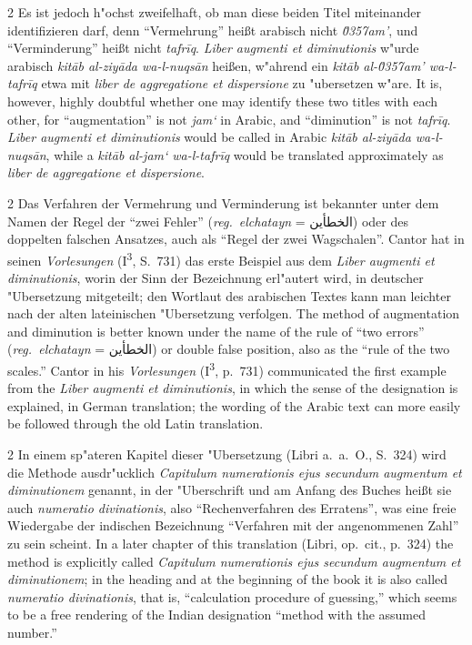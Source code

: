 \documentclass[10pt,a4paper]{article}
\renewcommand{\switchcolumn}{\syncronize\nointerlineskip\columnbreak}
\newcommand{\RL}[1]{\beginR#1\endR}
\newcommand{\ar}[1]{{\arabicfont\RL{#1}}}
\newcommand{\enquote}[1]{``#1''}
\begin{document}
\begin{paracol}{2}
Es ist jedoch h"ochst zweifelhaft, ob man diese beiden Titel miteinander identifizieren darf, denn \enquote{Vermehrung} hei\ss{}t arabisch nicht \textit{\u0357{}am'}, und \enquote{Verminderung} hei\ss{}t nicht \textit{tafr\={i}q}. \textit{Liber augmenti et diminutionis} w"urde arabisch \textit{kit\=ab al-ziy\=ada wa-l-nuqs\=an} hei\ss{}en, w"ahrend ein \textit{kit\=ab al-\u0357{}am' wa-l-tafr\={i}q} etwa mit \textit{liber de aggregatione et dispersione} zu "ubersetzen w"are.
\switchcolumn
It is, however, highly doubtful whether one may identify these two titles with each other, for ``augmentation'' is not \textit{jam`} in Arabic, and ``diminution'' is not \textit{tafr\={i}q}. \textit{Liber augmenti et diminutionis} would be called in Arabic \textit{kit\=ab al-ziy\=ada wa-l-nuqs\=an}, while a \textit{kit\=ab al-jam` wa-l-tafr\={i}q} would be translated approximately as \textit{liber de aggregatione et dispersione}.
\end{paracol}

\begin{paracol}{2}
Das Verfahren der Vermehrung und Verminderung ist bekannter unter dem Namen der Regel der \enquote{zwei Fehler} (\textit{reg.\ elchatayn} = \ar{الخطأين}) oder des doppelten falschen Ansatzes, auch als \enquote{Regel der zwei Wagschalen}. Cantor hat in seinen \textit{Vorlesungen} (I\textsuperscript{3}, S.\ 731) das erste Beispiel aus dem \textit{Liber augmenti et diminutionis}, worin der Sinn der Bezeichnung erl"autert wird, in deutscher "Ubersetzung mitgeteilt; den Wortlaut des arabischen Textes kann man leichter nach der alten lateinischen "Ubersetzung verfolgen.
\switchcolumn
The method of augmentation and diminution is better known under the name of the rule of ``two errors'' (\textit{reg.\ elchatayn} = \ar{الخطأين}) or double false position, also as the ``rule of the two scales.'' Cantor in his \textit{Vorlesungen} (I\textsuperscript{3}, p.\ 731) communicated the first example from the \textit{Liber augmenti et diminutionis}, in which the sense of the designation is explained, in German translation; the wording of the Arabic text can more easily be followed through the old Latin translation.
\end{paracol}

\begin{paracol}{2}
In einem sp"ateren Kapitel dieser "Ubersetzung (Libri a.\ a.\ O., S.\ 324) wird die Methode ausdr"ucklich \textit{Capitulum numerationis ejus secundum augmentum et diminutionem} genannt, in der "Uberschrift und am Anfang des Buches hei\ss{}t sie auch \textit{numeratio divinationis}, also \enquote{Rechenverfahren des Erratens}, was eine freie Wiedergabe der indischen Bezeichnung \enquote{Verfahren mit der angenommenen Zahl} zu sein scheint.
\switchcolumn
In a later chapter of this translation (Libri, op.\ cit., p.\ 324) the method is explicitly called \textit{Capitulum numerationis ejus secundum augmentum et diminutionem}; in the heading and at the beginning of the book it is also called \textit{numeratio divinationis}, that is, ``calculation procedure of guessing,'' which seems to be a free rendering of the Indian designation ``method with the assumed number.''
\end{paracol}
\end{document}
